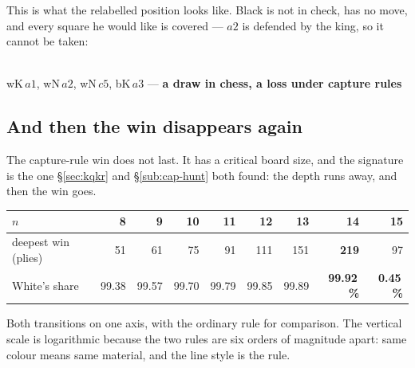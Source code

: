 \documentclass[11pt]{article}
\begin{document}
\noindent
This is what the relabelled position looks like. Black is not in check, has no
move, and every square he would like is covered --- $a2$ is defended by the
king, so it cannot be taken:

\begin{center}
\begin{minipage}{0.62\textwidth}\centering
{}\\[1.5mm]
{\small\color{knnk}wK\,$a1$, wN\,$a2$, wN\,$c5$, bK\,$a3$ ---
\textbf{a draw in chess, a loss under capture rules}}
\end{minipage}
\end{center}

\subsection{And then the win disappears again}\label{sub:kn-vanish}

The capture-rule win does not last. It has a critical board size, and the
signature is the one \S\ref{sec:kqkr} and \S\ref{sub:cap-hunt} both found: the depth runs away, and then
the win goes.

\begin{center}\small
\begin{tabular}{@{}lrrrrrrrr@{}}
\toprule
$n$ & 8 & 9 & 10 & 11 & 12 & 13 & \textbf{14} & \textbf{15} \\
\midrule
deepest win (plies) & 51 & 61 & 75 & 91 & 111 & 151 & \textbf{219} & 97 \\
White's share       & 99.38 & 99.57 & 99.70 & 99.79 & 99.85 & 99.89 & \textbf{99.92\,\%} & \textbf{0.45\,\%} \\
\bottomrule
\end{tabular}
\end{center}

\noindent
Both transitions on one axis, with the ordinary rule for comparison. The
vertical scale is logarithmic because the two rules are six orders of magnitude
apart: same colour means same material, and the line style is the rule.
\end{document}
